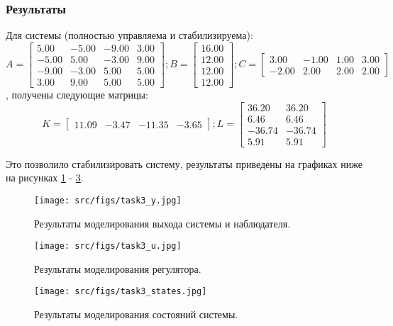 \subsubsection{Результаты}
Для системы (полностью управляема и стабилизируема):
\[
    A = \begin{bmatrix}
        5.00 & -5.00 & -9.00 &  3.00\\
       -5.00 &  5.00 & -3.00 &  9.00\\
       -9.00 & -3.00 &  5.00 &  5.00\\
        3.00 &  9.00 &  5.00 &  5.00
      \end{bmatrix};
    B = \begin{bmatrix}
        16.00\\
        12.00\\
        12.00\\
        12.00
      \end{bmatrix};
    C = \begin{bmatrix}
        3.00 & -1.00 &  1.00 &  3.00\\
       -2.00 &  2.00 &  2.00 &  2.00
      \end{bmatrix}
\],
получены следующие матрицы:
\[
    K = \begin{bmatrix}
        11.09 & -3.47 & -11.35 & -3.65
      \end{bmatrix};
    L = \begin{bmatrix}
        36.20 &  36.20\\
        6.46 &  6.46\\
       -36.74 & -36.74\\
        5.91 &  5.91
      \end{bmatrix}
\]

Это позволило стабилизировать систему, результаты приведены на графиках ниже на рисунках \ref{fig:task3_y} - \ref{fig:task3_states}.
\begin{figure}[ht!]
    \centering
    \texttt{[image: src/figs/task3\_y.jpg]}
    \caption{Результаты моделирования выхода системы и наблюдателя.}
    \label{fig:task3_y}
\end{figure}
\begin{figure}[ht!]
    \centering
    \texttt{[image: src/figs/task3\_u.jpg]}
    \caption{Результаты моделирования регулятора.}
    \label{fig:task3_u}
\end{figure}
\begin{figure}[ht!]
    \centering
    \texttt{[image: src/figs/task3\_states.jpg]}
    \caption{Результаты моделирования состояний системы.}
    \label{fig:task3_states}
\end{figure}